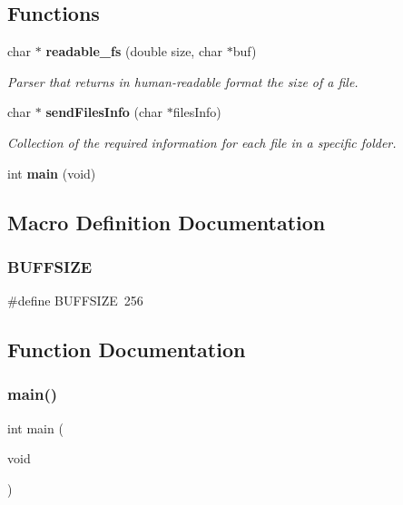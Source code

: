 \subsection*{Functions}
\begin{DoxyCompactItemize}
\item 
char $\ast$ \textbf{ readable\+\_\+fs} (double size, char $\ast$buf)
\begin{DoxyCompactList}\small\item\em Parser that returns in human-\/readable format the size of a file. \end{DoxyCompactList}\item 
char $\ast$ \textbf{ send\+Files\+Info} (char $\ast$files\+Info)
\begin{DoxyCompactList}\small\item\em Collection of the required information for each file in a specific folder. \end{DoxyCompactList}\item 
int \textbf{ main} (void)
\end{DoxyCompactItemize}


\subsection{Macro Definition Documentation}
\mbox{\label{files_8c_a39912bfe2a55f30e269196f9141d845d}} 
\subsubsection{B\+U\+F\+F\+S\+I\+ZE}
{\footnotesize\ttfamily \#define B\+U\+F\+F\+S\+I\+ZE~256}



\subsection{Function Documentation}
\mbox{\label{files_8c_a840291bc02cba5474a4cb46a9b9566fe}} 
\subsubsection{main()}
{\footnotesize\ttfamily int main (\begin{DoxyParamCaption}\item[{void}]{ }\end{DoxyParamCaption})}

